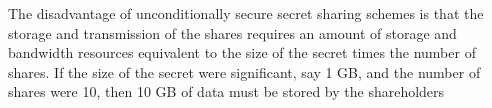 The disadvantage of unconditionally secure secret sharing schemes is that the storage and transmission of the shares requires an amount of storage and bandwidth resources equivalent to the size of the secret times the number of shares. If the size of the secret were significant, say 1 GB, and the number of shares were 10, then 10 GB of data must be stored by the shareholders
